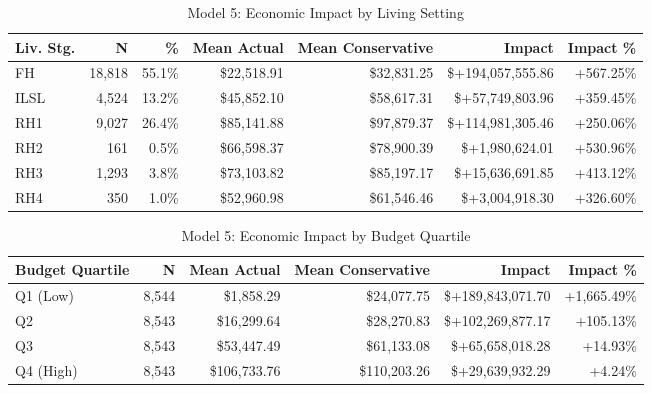 \begin{table}[htbp]
\centering
\small
\caption{Model 5: Economic Impact by Living Setting}
\label{tab:model5_impact_living}
\begin{tabular}{lrrrrrr}
\toprule
\textbf{Liv. Stg.} & \textbf{N} & \textbf{\%} & \textbf{Mean Actual} & \textbf{Mean Conservative} & \textbf{Impact} & \textbf{Impact \%} \\
\midrule
FH & 18,818 & 55.1\% & \$22,518.91 & \$32,831.25 & \$+194,057,555.86 & +567.25\% \\
ILSL & 4,524 & 13.2\% & \$45,852.10 & \$58,617.31 & \$+57,749,803.96 & +359.45\% \\
RH1 & 9,027 & 26.4\% & \$85,141.88 & \$97,879.37 & \$+114,981,305.46 & +250.06\% \\
RH2 & 161 & 0.5\% & \$66,598.37 & \$78,900.39 & \$+1,980,624.01 & +530.96\% \\
RH3 & 1,293 & 3.8\% & \$73,103.82 & \$85,197.17 & \$+15,636,691.85 & +413.12\% \\
RH4 & 350 & 1.0\% & \$52,960.98 & \$61,546.46 & \$+3,004,918.30 & +326.60\% \\
\bottomrule
\end{tabular}
\end{table}

\begin{table}[htbp]
\centering
\small
\caption{Model 5: Economic Impact by Budget Quartile}
\label{tab:model5_impact_quartile}
\begin{tabular}{lrrrrr}
\toprule
\textbf{Budget Quartile} & \textbf{N} & \textbf{Mean Actual} & \textbf{Mean Conservative} & \textbf{Impact} & \textbf{Impact \%} \\
\midrule
Q1 (Low) & 8,544 & \$1,858.29 & \$24,077.75 & \$+189,843,071.70 & +1,665.49\% \\
Q2 & 8,543 & \$16,299.64 & \$28,270.83 & \$+102,269,877.17 & +105.13\% \\
Q3 & 8,543 & \$53,447.49 & \$61,133.08 & \$+65,658,018.28 & +14.93\% \\
Q4 (High) & 8,543 & \$106,733.76 & \$110,203.26 & \$+29,639,932.29 & +4.24\% \\
\bottomrule
\end{tabular}
\end{table}

